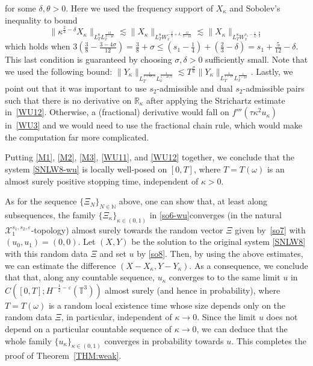 \documentclass[%
11pt,  reqno]{amsart}
\newcommand{\1}{\hspace{0.2mm}\text{I}\hspace{0.2mm}}
\newcommand{\noi}{\noindent}
\newcommand{\R}{\mathbb{R}}
\newcommand{\T}{\mathbb{T}}
\newcommand{\dl}{\delta}
\newcommand{\eps}{\varepsilon}
\newcommand{\kk}{\kappa}
\newcommand{\s}{\sigma}
\newcommand{\ta}{\theta}
\renewcommand{\o}{\omega}
\newcommand{\les}{\lesssim}
\newcommand{\N}{\mathbb{N}}
\numberwithin{equation}{section}
\numberwithin{theorem}{section}
\begin{document}
\noi
for some $\dl, \ta >0$. Here we used the frequency  support of $ X_\kk$ and
 Sobolev's inequality to bound
\[
\| \kk^{\frac{2}{3}-\dl} X_\kk\|_{L^8_T L^\frac{12}{3-4\s}_x}  \lesssim
\|  X_\kk\|_{L^8_T W^{- \frac23+\delta,\frac{12}{3-4\s}}_x} \lesssim
\|  X_\kk\|_{L^8_T W^{s_1-\frac14, \frac83 }_x}
\]
which holds when
 $3(\frac{3}{8} - \frac{3-4\s}{12}) 
 = \frac38 + \s \leq  (s_1 - \frac 14 ) + (\frac 23 - \dl) = s_1 + \frac{5}{12}-\dl$. This last condition is guaranteed by choosing $\s, \dl > 0$ sufficiently small. 
 Note that we  used the following bound:
 $ \| Y_\kk\|_{L^\frac{4}{1+8\s/3}_T L^\frac{4}{1-4\s/3}_x} 
 \les T^\frac{\s}{6} \| Y_\kk\|_{L^\frac{4}{1+2\s}_T L^\frac{4}{1-2\s}_x}$.
Lastly, we point out that 
it was important to use $s_2$-admissible
and dual $s_2$-admissible pairs
such that there is no derivative on $\R_\kk$
after applying the Strichartz estimate in~\eqref{WU12}.
Otherwise, a (fractional) derivative would fall on $f'''(\tau \kk^2 u_\kk)$ in~\eqref{WU3}
and we would need to use the fractional chain rule,
which would make the computation far more complicated.


Putting \eqref{M1}, \eqref{M2},  \eqref{M3}, 
\eqref{WU11}, and \eqref{WU12} together, 
we conclude that the system \eqref{SNLW8-wu}
is locally well-posed on $[0, T]$, 
where  $T = T(\o)$
is an  almost surely positive stopping time, 
independent of $\kk > 0$.






 As for the sequence $\{\Xi_N\}_{N\in \N}$ above, 
 one can show that, at least along subsequences, 
 the family $\{\Xi_\kk\}_{\kk\in(0,1)}$ in \eqref{so6-wu}converges (in the natural 
 $\mathcal{X}^{s_1, s_2,  \eps}_1$-topology)  almost surely 
 towards the random vector $\Xi$ given by~\eqref{so7} with $(u_0,u_1)=(0,0)$.
Let $(X, Y)$ be the solution to the original system \eqref{SNLW8}
with this random data  $\Xi$
and set $u$ by \eqref{so8}.
Then, by using the above estimates, 
we can estimate the difference $(X - X_\kk, Y - Y_\kk)$.
As a consequence, 
we conclude that that, along any countable sequence, 
 $u_\kk$ converges to 
to the same limit $u$ 
in $C([0,T];H^{-\frac12 -\eps}(\T^3))$
almost surely (and hence in probability), 
where $T = T(\o)$ is a random local existence time
 whose size depends only on the random data $\Xi$, 
in particular, independent of $\kk \to 0$.
Since the limit $u$ does not depend on a particular countable sequence of $\kk \to 0$, 
we can deduce that the whole family $\{u_\kk\}_{\kk \in (0, 1)}$ converges in probability towards $u$.
This completes the proof of Theorem~\ref{THM:weak}.
\end{document}
